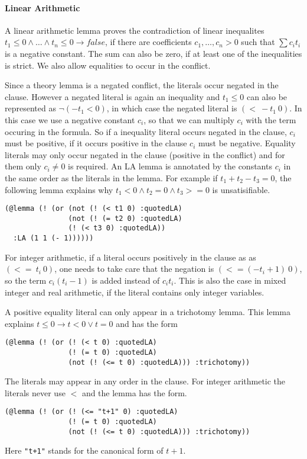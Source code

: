 \documentclass[a4paper]{article}
\begin{document}
\paragraph{Linear Arithmetic}

A linear arithmetic lemma proves the contradiction of linear
inequalites $t_1\leq 0\land \dots\land t_n\leq 0 \rightarrow false$, if
there are coefficients $c_1,\dots,c_n > 0$ such that $\sum c_it_i$ is
a negative constant.  The sum can also be zero, if at least one of the
inequalities is strict.  We also allow equalities to occur in the
conflict.

Since a theory lemma is a negated conflict, the literals occur negated
in the clause.  However a negated literal is again an inequality and
$t_1\leq 0$ can also be represented as $\neg (-t_1 <0)$, in which case
the negated literal is $(<\ -t_1\ 0)$.  In this case we use a negative
constant $c_i$, so that we can multiply $c_i$ with the term occuring
in the formula.  So if a inequality literal occurs negated in the
clause, $c_i$ must be positive, if it occurs positive in the clause
$c_i$ must be negative.  Equality literals may only occur negated in
the clause (positive in the conflict) and for them only $c_i\neq 0$ is
required.  An LA lemma is annotated by the constants $c_i$ in the same
order as the literals in the lemma.  For example if $t_1 + t_2 - t_3 =
0$, the following lemma explains why $t_1 < 0 \land t_2 = 0 \land t_3
>= 0$ is unsatisifiable.
\begin{verbatim}
(@lemma (! (or (not (! (< t1 0) :quotedLA)
               (not (! (= t2 0) :quotedLA)
               (! (< t3 0) :quotedLA))
  :LA (1 1 (- 1))))))
\end{verbatim}

For integer arithmetic, if a literal occurs positively in the clause as
as $(<=\ t_i\ 0)$, one needs to take care that the negation is
$(<= (-t_i+1)\ 0)$, so the term $c_i(t_i - 1)$ is added instead
of $c_i t_i$.  This is also the case in mixed integer and real arithmetic,
if the literal contains only integer variables.

A positive equality literal can only appear in a trichotomy lemma.
This lemma explains $t \leq 0 \rightarrow t < 0 \lor t=0$ and has the form
\begin{verbatim}
(@lemma (! (or (! (< t 0) :quotedLA)
               (! (= t 0) :quotedLA)
               (not (! (<= t 0) :quotedLA))) :trichotomy))
\end{verbatim}
The literals may appear in any order in the clause.  For integer
arithmetic the literals never use $<$ and the lemma has the form.
\begin{verbatim}
(@lemma (! (or (! (<= "t+1" 0) :quotedLA)
               (! (= t 0) :quotedLA)
               (not (! (<= t 0) :quotedLA))) :trichotomy))
\end{verbatim}
Here \verb|"t+1"| stands for the canonical form of $t+1$.
\end{document}
